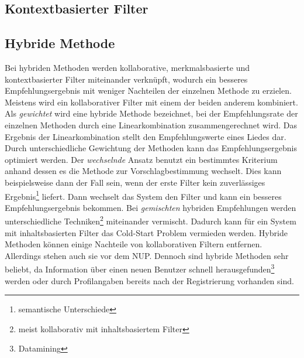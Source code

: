 \documentclass[twosided,a4,10pt]{article}
\begin{document}
\begin{multicols}{2}
		\subsection{Kontextbasierter Filter}				
		\subsection{Hybride Methode}
		Bei hybriden Methoden werden kollaborative, merkmalsbasierte und kontextbasierter Filter miteinander verknüpft, wodurch ein besseres Empfehlungsergebnis mit weniger Nachteilen der einzelnen Methode zu erzielen. Meistens wird ein kollaborativer Filter mit einem der beiden anderem kombiniert.\newline
		Als \textit{gewichtet} wird eine hybride Methode bezeichnet, bei der Empfehlungsrate der einzelnen Methoden durch eine Linearkombination zusammengerechnet wird. Das Ergebnis der Linearkombination stellt den Empfehlungswerte eines Liedes dar. Durch unterschiedliche Gewichtung der Methoden kann das Empfehlungsergebnis optimiert werden. Der \textit{wechselnde} Ansatz benutzt ein bestimmtes Kriterium anhand dessen es die Methode zur Vorschlagbestimmung wechselt. Dies kann beispielsweise dann der Fall sein, wenn der erste Filter kein zuverlässiges Ergebnis\footnote[6]{semantische Unterschiede} liefert. Dann wechselt das System den Filter und kann ein besseres Empfehlungsergebnis bekommen. Bei \textit{gemischten} hybriden Empfehlungen werden unterschiedliche Techniken\footnote[7]{meist kollaborativ mit inhaltsbasiertem Filter} miteinander vermischt. Dadurch kann für ein System mit inhaltsbasierten Filter das Cold-Start Problem vermieden werden.\newline
		Hybride Methoden können einige Nachteile von kollaborativen Filtern entfernen. Allerdings stehen auch sie vor dem NUP. Dennoch sind hybride Methoden sehr beliebt, da Information über einen neuen Benutzer schnell herausgefunden\footnote[8]{Datamining} werden oder durch Profilangaben bereits nach der Registrierung vorhanden sind. \cite{burke}

\end{multicols}
\end{document}
